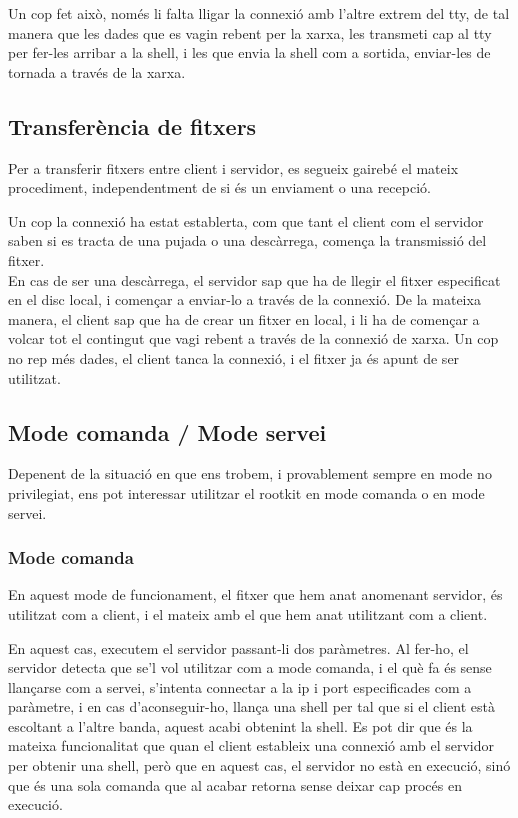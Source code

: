 Un cop fet això, només li falta lligar la connexió amb l'altre extrem del tty, de tal manera que les dades que es vagin rebent per la xarxa,
les transmeti cap al tty per fer-les arribar a la shell, i les que envia la shell com a sortida, enviar-les de tornada a través de la xarxa.

\subsection{Transferència de fitxers}

Per a transferir fitxers entre client i servidor, es segueix gairebé el mateix procediment, independentment de si és un enviament o una recepció.

Un cop la connexió ha estat establerta, com que tant el client com el servidor saben si es tracta de una pujada o una descàrrega, comença la transmissió
del fitxer. \\

En cas de ser una descàrrega, el servidor sap que ha de llegir el fitxer especificat en el disc local, i començar a enviar-lo a través de la connexió. 
De la mateixa manera, el client sap que ha de crear un fitxer en local, i li ha de començar a volcar tot el contingut que vagi rebent a través de
la connexió de xarxa. Un cop no rep més dades, el client tanca la connexió, i el fitxer ja és apunt de ser utilitzat.

\subsection{Mode comanda / Mode servei}

Depenent de la situació en que ens trobem, i provablement sempre en mode no privilegiat, ens pot interessar utilitzar el rootkit en mode comanda o
en mode servei. 

\subsubsection{Mode comanda}
En aquest mode de funcionament, el fitxer que hem anat anomenant servidor, és utilitzat com a client, i el mateix amb el que hem anat utilitzant com
a client. 

En aquest cas, executem el servidor passant-li dos paràmetres. Al fer-ho, el servidor detecta que se'l vol utilitzar com a mode comanda, i el què fa
és sense llançarse com a servei, s'intenta connectar a la ip i port especificades com a paràmetre, i en cas d'aconseguir-ho, llança una shell per tal
que si el client està escoltant a l'altre banda, aquest acabi obtenint la shell. Es pot dir que és la mateixa funcionalitat que quan el client estableix
una connexió amb el servidor per obtenir una shell, però que en aquest cas, el servidor no està en execució, sinó que és una sola comanda que al acabar
retorna sense deixar cap procés en execució.

